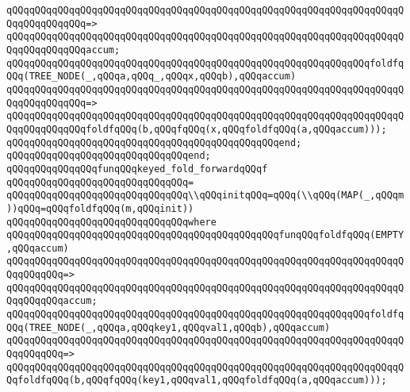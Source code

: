 \verb|qQQqqQQqqQQqqQQqqQQqqQQqqQQqqQQqqQQqqQQqqQQqqQQqqQQqqQQqqQQqqQQqqQQqqQQqqQQqqQQqqQQq=>|\newline
\verb|qQQqqQQqqQQqqQQqqQQqqQQqqQQqqQQqqQQqqQQqqQQqqQQqqQQqqQQqqQQqqQQqqQQqqQQqqQQqqQQqqQQqaccum;|\newline
\newline
\verb|qQQqqQQqqQQqqQQqqQQqqQQqqQQqqQQqqQQqqQQqqQQqqQQqqQQqqQQqqQQqqQQqfoldfqQQq(TREE_NODE(_,qQQqa,qQQq_,qQQqx,qQQqb),qQQqaccum)|\newline
\verb|qQQqqQQqqQQqqQQqqQQqqQQqqQQqqQQqqQQqqQQqqQQqqQQqqQQqqQQqqQQqqQQqqQQqqQQqqQQqqQQqqQQq=>|\newline
\verb|qQQqqQQqqQQqqQQqqQQqqQQqqQQqqQQqqQQqqQQqqQQqqQQqqQQqqQQqqQQqqQQqqQQqqQQqqQQqqQQqqQQqfoldfqQQq(b,qQQqfqQQq(x,qQQqfoldfqQQq(a,qQQqaccum)));|\newline
\verb|qQQqqQQqqQQqqQQqqQQqqQQqqQQqqQQqqQQqqQQqqQQqqQQqend;|\newline
\verb|qQQqqQQqqQQqqQQqqQQqqQQqqQQqqQQqend;|\newline
\newline
\verb|qQQqqQQqqQQqqQQqfunqQQqkeyed_fold_forwardqQQqf|\newline
\verb|qQQqqQQqqQQqqQQqqQQqqQQqqQQqqQQq=|\newline
\verb|qQQqqQQqqQQqqQQqqQQqqQQqqQQqqQQq\\qQQqinitqQQq=qQQq(\\qQQq(MAP(_,qQQqm))qQQq=qQQqfoldfqQQq(m,qQQqinit))|\newline
\verb|qQQqqQQqqQQqqQQqqQQqqQQqqQQqqQQqwhere|\newline
\verb|qQQqqQQqqQQqqQQqqQQqqQQqqQQqqQQqqQQqqQQqqQQqqQQqfunqQQqfoldfqQQq(EMPTY,qQQqaccum)|\newline
\verb|qQQqqQQqqQQqqQQqqQQqqQQqqQQqqQQqqQQqqQQqqQQqqQQqqQQqqQQqqQQqqQQqqQQqqQQqqQQqqQQq=>|\newline
\verb|qQQqqQQqqQQqqQQqqQQqqQQqqQQqqQQqqQQqqQQqqQQqqQQqqQQqqQQqqQQqqQQqqQQqqQQqqQQqqQQqaccum;|\newline
\newline
\verb|qQQqqQQqqQQqqQQqqQQqqQQqqQQqqQQqqQQqqQQqqQQqqQQqqQQqqQQqqQQqqQQqfoldfqQQq(TREE_NODE(_,qQQqa,qQQqkey1,qQQqval1,qQQqb),qQQqaccum)|\newline
\verb|qQQqqQQqqQQqqQQqqQQqqQQqqQQqqQQqqQQqqQQqqQQqqQQqqQQqqQQqqQQqqQQqqQQqqQQqqQQqqQQq=>|\newline
\verb|qQQqqQQqqQQqqQQqqQQqqQQqqQQqqQQqqQQqqQQqqQQqqQQqqQQqqQQqqQQqqQQqqQQqqQQqfoldfqQQq(b,qQQqfqQQq(key1,qQQqval1,qQQqfoldfqQQq(a,qQQqaccum)));|\newline
